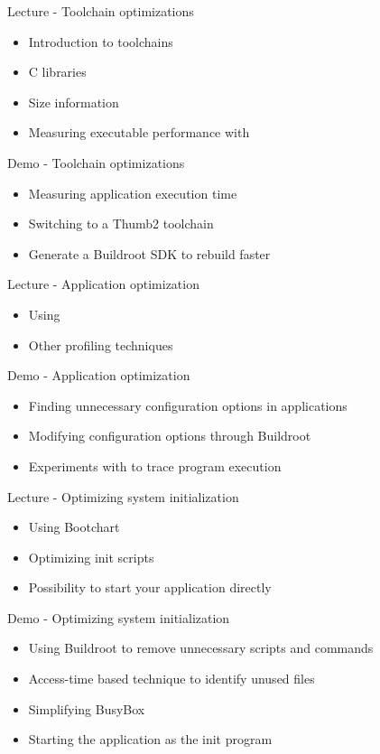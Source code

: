 \documentclass[a4paper,12pt,obeyspaces,spaces,hyphens]{article}
\begin{document}
\feagendaonecolumn
{Lecture - Toolchain optimizations}
{
  \begin{itemize}
  \item Introduction to toolchains
  \item C libraries
  \item Size information
  \item Measuring executable performance with 
  \end{itemize}
}

\feagendaonecolumn
{Demo - Toolchain optimizations}
{
  \begin{itemize}
  \item Measuring application execution time
  \item Switching to a Thumb2 toolchain
  \item Generate a Buildroot SDK to rebuild faster
  \end{itemize}
}

\feagendatwocolumn
{Lecture - Application optimization}
{
  \begin{itemize}
  \item Using 
  \item Other profiling techniques
  \end{itemize}
}
{Demo - Application optimization}
{
 \begin{itemize}
 \item Finding unnecessary configuration options in applications
 \item Modifying configuration options through Buildroot
 \item Experiments with  to trace program execution
 \end{itemize}
}

\feagendatwocolumn
{Lecture - Optimizing system initialization}
{
  \begin{itemize}
  \item Using Bootchart
  \item Optimizing init scripts
  \item Possibility to start your application directly
  \end{itemize}
}
{Demo - Optimizing system initialization}
{
 \begin{itemize}
 \item Using Buildroot to remove unnecessary scripts and commands
 \item Access-time based technique to identify  unused files
 \item Simplifying BusyBox
 \item Starting the application as the init program
 \end{itemize}
}
\end{document}
